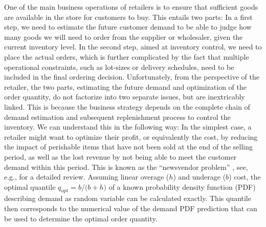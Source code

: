 \documentclass[BCOR=1mm, DIV=calc,10pt,
twoside=true,
twocolumn,
headings=normal]{scrartcl}
\begin{document}
One of the main business operations of retailers is to ensure that sufficient goods are available in the store for customers to buy. This entails two parts: In a first step, we need to estimate the future customer demand to be able to judge how many goods we will need to order from the supplier or wholesaler, given the current inventory level. In the second step, aimed at inventory control, we need to place the actual orders, which is further complicated by the fact that multiple operational constraints, such as lot-sizes or delivery schedules, need to be included in the final ordering decision. Unfortunately, from the perspective of the retailer, the two parts, estimating the future demand and optimization of the order quantity, do not factorize into two separate issues, but are inextricably linked. This is because the business strategy depends on the complete chain of demand estimation and subsequent replenishment process to control the inventory. We can understand this in the following way: In the simplest case, a retailer might want to optimize their profit, or equivalently the cost, by reducing the impact of perishable items that have not been sold at the end of the selling period, as well as the lost revenue by not being able to meet the customer demand within this period. This is known as the ``newsvendor problem'' \cite{Edgeworth}, see, e.g., \cite{Khouja1999537} for a detailed review. Assuming linear overage ($h$) and underage ($b$) cost, the optimal quantile $q_{\mathrm{opt}} = {b}/{(b+h})$ of a known probability density function (PDF) describing demand as random variable can be calculated exactly. This quantile then corresponds to the numerical value of the demand PDF prediction that can be used to determine the optimal order quantity.
\end{document}

